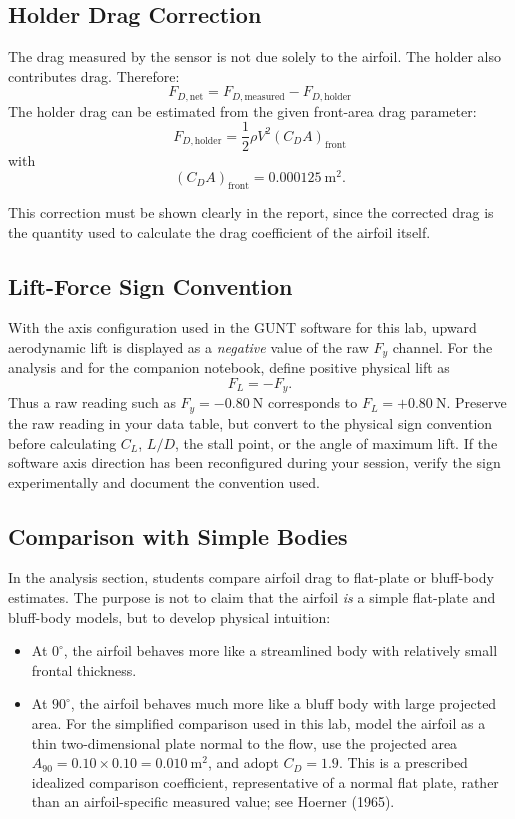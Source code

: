\documentclass[12pt,letterpaper]{article}
\begin{document}
\subsection{Holder Drag Correction}
The drag measured by the sensor is not due solely to the airfoil. The holder also contributes drag. Therefore:
\begin{equation}
F_{D,\text{net}} = F_{D,\text{measured}} - F_{D,\text{holder}}
\label{eq:dragcorrection}
\end{equation}
The holder drag can be estimated from the given front-area drag parameter:
\begin{equation}
F_{D,\text{holder}} = \frac{1}{2}\rho V^2\left(C_DA\right)_{\text{front}}
\label{eq:holderdrag}
\end{equation}
with
\[
\left(C_DA\right)_{\text{front}} = 0.000125~\text{m}^2.
\]

This correction must be shown clearly in the report, since the corrected drag is the quantity used to calculate the drag coefficient of the airfoil itself.


\subsection{Lift-Force Sign Convention}
With the axis configuration used in the GUNT software for this lab, upward aerodynamic lift is displayed as a \emph{negative} value of the raw \(F_y\) channel. For the analysis and for the companion notebook, define positive physical lift as
\begin{equation}
F_L = -F_y.
\label{eq:lift-sign}
\end{equation}
Thus a raw reading such as \(F_y=-0.80~\text{N}\) corresponds to \(F_L=+0.80~\text{N}\). Preserve the raw reading in your data table, but convert to the physical sign convention before calculating \(C_L\), \(L/D\), the stall point, or the angle of maximum lift. If the software axis direction has been reconfigured during your session, verify the sign experimentally and document the convention used.

\subsection{Comparison with Simple Bodies}
In the analysis section, students compare airfoil drag to flat-plate or bluff-body estimates. The purpose is not to claim that the airfoil \emph{is} a simple flat-plate and bluff-body models, but to develop physical intuition:
\begin{itemize}[leftmargin=*]
    \item At \(0^\circ\), the airfoil behaves more like a streamlined body with relatively small frontal thickness.
    \item At \(90^\circ\), the airfoil behaves much more like a bluff body with large projected area. For the simplified comparison used in this lab, model the airfoil as a thin two-dimensional plate normal to the flow, use the projected area \(A_{90}=0.10\times0.10=0.010~\mathrm{m^2}\), and adopt \(C_D=1.9\). This is a prescribed idealized comparison coefficient, representative of a normal flat plate, rather than an airfoil-specific measured value; see Hoerner (1965).
\end{itemize}
\end{document}
